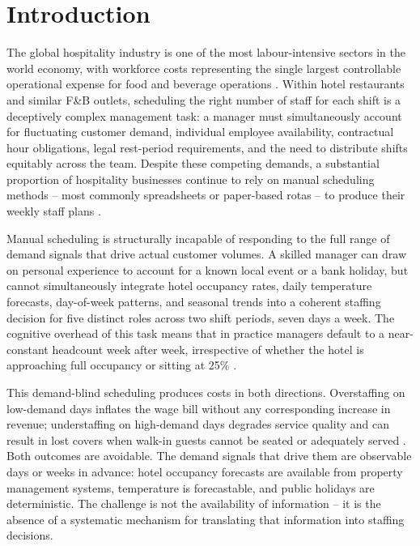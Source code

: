 \documentclass[12pt,a4paper,oneside]{article}
\begin{document}
\newpage
\thispagestyle{plain}
\tableofcontents
\newpage

\section{Introduction}
\label{sec:introduction}


The global hospitality industry is one of the most labour-intensive sectors in the world economy, with workforce costs representing the single largest controllable operational expense for food and beverage operations \citep{ernst2004}. Within hotel restaurants and similar F\&B outlets, scheduling the right number of staff for each shift is a deceptively complex management task: a manager must simultaneously account for fluctuating customer demand, individual employee availability, contractual hour obligations, legal rest-period requirements, and the need to distribute shifts equitably across the team. Despite these competing demands, a substantial proportion of hospitality businesses continue to rely on manual scheduling methods -- most commonly spreadsheets or paper-based rotas -- to produce their weekly staff plans \citep{thompson2004}.

Manual scheduling is structurally incapable of responding to the full range of demand signals that drive actual customer volumes. A skilled manager can draw on personal experience to account for a known local event or a bank holiday, but cannot simultaneously integrate hotel occupancy rates, daily temperature forecasts, day-of-week patterns, and seasonal trends into a coherent staffing decision for five distinct roles across two shift periods, seven days a week. The cognitive overhead of this task means that in practice managers default to a near-constant headcount week after week, irrespective of whether the hotel is approaching full occupancy or sitting at 25\% \citep{choi2009}.

This demand-blind scheduling produces costs in both directions. Overstaffing on low-demand days inflates the wage bill without any corresponding increase in revenue; understaffing on high-demand days degrades service quality and can result in lost covers when walk-in guests cannot be seated or adequately served \citep{choi2009}. Both outcomes are avoidable. The demand signals that drive them are observable days or weeks in advance: hotel occupancy forecasts are available from property management systems, temperature is forecastable, and public holidays are deterministic. The challenge is not the availability of information -- it is the absence of a systematic mechanism for translating that information into staffing decisions.
\end{document}
